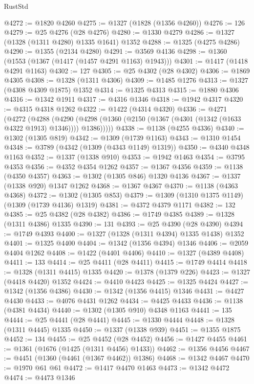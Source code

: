 \begin{lexlean}{RustStd}
\begin{coremodule}
@4272 := @1820 @4260
@4275 := @1327 (@1828 (@1356 @4260))
@4276 := 126
@4279 := @25 @4276 (@28 @4276)
@4280 := @1330 @4279
@4286 := @1327 (@1328 (@1311 @4280) @1335 @1641) @1352
@4288 := @1325 (@4275 @4286)
@4290 := @1355 (@2134 @4280)
@4291 := @3569 @4136
@4298 := @1360 (@1553 (@1367 (@1417 (@1457 @4291 @1163) @1943)))
@4301 := @1417 (@1418 @4291 @1163)
@4302 := 127
@4305 := @25 @4302 (@28 @4302)
@4306 := @1869 @4305
@4308 := @1328 (@1311 @4306)
@4309 := @1485 @1276
@4313 := @1327 (@4308 @4309 @1875) @1352
@4314 := @1325 @4313
@4315 := @1880 @4306
@4316 := @1342 @1911
@4317 := @4316 @1346
@4318 := @1942 @4317
@4320 := @4315 @4318 @1262
@4322 := @1422 (@4314 @4320)
@4336 := @4271
    (@4272
      (@4288
        (@4290 (@4298 (@1360 (@2150 (@1367 (@4301 (@1342 (@1633 @4322 @1913) @1346)))) @1386)))))
@4338 := @1138 (@4255 @4336)
@4340 := @1302 (@1305 @819)
@4342 := @1309 (@1739 @1163)
@4343 := @1310 @1454
@4348 := @3789 (@4342 (@1309 (@4343 @1149) @1319))
@4350 := @4340 @4348 @1163
@4352 := @1337 (@1338 @910)
@4353 := @1942 @1463
@4354 := @3795 @4353
@4356 := @4352 @4354 @1262
@4357 := @1367 @4356
@4359 := @1138 (@4350 @4357)
@4363 := @1302 (@1305 @846) @1320 @4136
@4367 := @1337 (@1338 @920) @1347 @1262
@4368 := @1367 @4367
@4370 := @1138 (@4363 @4368)
@4372 := @1302 (@1305 @853)
@4379 := @1309 (@1310 @1375 @1149) (@1309 (@1739 @4136) @1319)
@4381 := @4372 @4379 @1171
@4382 := 132
@4385 := @25 @4382 (@28 @4382)
@4386 := @1749 @4385
@4389 := @1328 (@1311 @4386) @1335
@4390 := 131
@4393 := @25 @4390 (@28 @4390)
@4394 := @1749 @4393
@4400 := @1327 (@1328 (@1311 @4394) @1335 @1438) @1352
@4401 := @1325 @4400
@4404 := @1342 (@1356 @4394) @1346
@4406 := @2059 @4404 @1262
@4408 := @1422 (@4401 @4406)
@4410 := @1327 (@4389 @4408)
@4411 := 133
@4414 := @25 @4411 (@28 @4411)
@4415 := @1749 @4414
@4418 := @1328 (@1311 @4415) @1335
@4420 := @1378 (@1379 @226)
@4423 := @1327 (@4418 @4420) @1352
@4424 := @4410 @4423
@4425 := @1325 @4424
@4427 := @1342 (@1356 @4386)
@4430 := @1342 (@1356 @4415) @1346
@4431 := @4427 @4430
@4433 := @4076 @4431 @1262
@4434 := @4425 @4433
@4436 := @1138 (@4381 @4434)
@4440 := @1302 (@1305 @910) @4348 @1163
@4441 := 135
@4444 := @25 @4441 (@28 @4441)
@4445 := @1330 @4444
@4448 := @1328 (@1311 @4445) @1335
@4450 := @1337 (@1338 @939)
@4451 := @1355 @1875
@4452 := 134
@4455 := @25 @4452 (@28 @4452)
@4456 := @1427 @4455
@4461 := @1361 (@1676 (@1425 (@1311 @4456) @1433))
@4462 := @1356 @4456
@4467 := @4451 (@1360 (@4461 (@1367 @4462)) @1386)
@4468 := @1342 @4467
@4470 := @1970 @61 @61
@4472 := @1417 @4470 @1463
@4473 := @1342 @4472
@4474 := @4473 @1346

\end{coremodule}
\end{lexlean}

